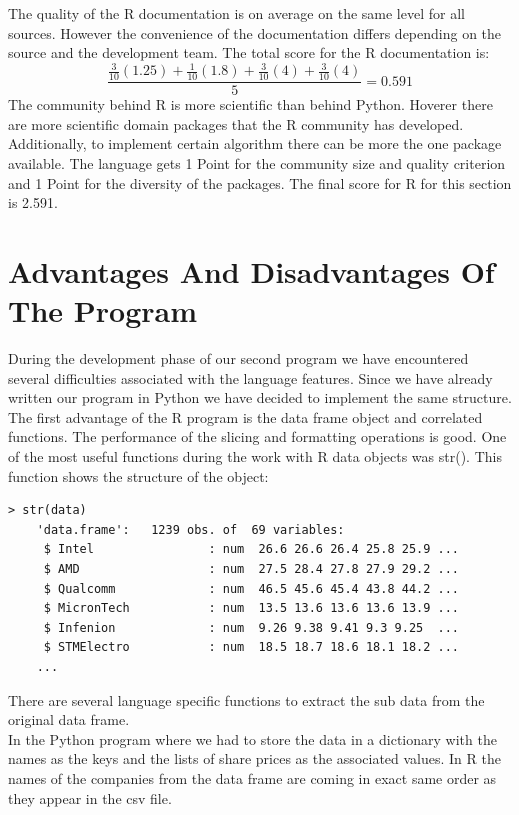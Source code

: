 \documentclass[
  twoside,
  11pt, a4paper,
  footinclude=true,
  headinclude=true,
  cleardoublepage=empty
]{scrreprt}
\begin{document}
    The quality of the R documentation is on average on the same level for all sources. However the convenience of the documentation differs depending on the source and the development team. The total score for the R documentation is:
    \[ \frac{\frac{3}{10}(1.25)+\frac{1}{10}(1.8)+\frac{3}{10}(4)+\frac{3}{10}(4)}{5}= 0.591 \] 
    The community behind R is more scientific than behind Python. Hoverer there are more scientific domain packages that the R community has developed. Additionally, to implement certain algorithm there can be more the one package available. The language gets 1 Point for the community size and quality criterion and 1 Point for the diversity of the packages. The final score for R for this section is 2.591.
    
    \section{Advantages And Disadvantages Of The Program}
    During the development phase of our second program we have encountered several difficulties associated with the language features. Since we have already written our program in Python we have decided to implement the same structure.\\
    The first advantage of the R program is the data frame object and correlated functions. The performance of the slicing and formatting operations is good. One of the most useful functions during the work with R data objects was str(). This function shows the structure of the object:
    \begin{lstlisting}[basicstyle=\footnotesize]
    > str(data)
    'data.frame':   1239 obs. of  69 variables:
     $ Intel                : num  26.6 26.6 26.4 25.8 25.9 ...
     $ AMD                  : num  27.5 28.4 27.8 27.9 29.2 ...
     $ Qualcomm             : num  46.5 45.6 45.4 43.8 44.2 ...
     $ MicronTech           : num  13.5 13.6 13.6 13.6 13.9 ...
     $ Infenion             : num  9.26 9.38 9.41 9.3 9.25  ...
     $ STMElectro           : num  18.5 18.7 18.6 18.1 18.2 ...
    ...
    \end{lstlisting}
    There are several language specific functions to extract the sub data from the original data frame.\\
    In the Python program where we had to store the data in a dictionary with the names as the keys and the lists of share prices as the associated values. In R the names of the companies from the data frame are coming in exact same order as they appear in the csv file.\\
\end{document}

